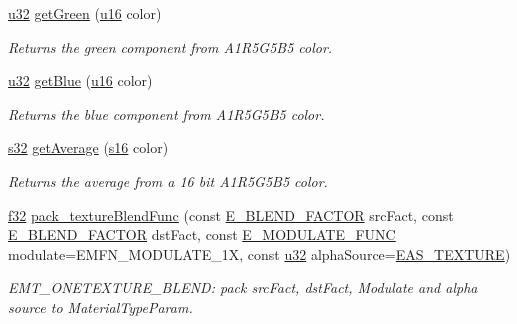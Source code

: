 \begin{DoxyCompactItemize}
\hyperlink{namespaceirr_a0416a53257075833e7002efd0a18e804}{u32} \hyperlink{namespaceirr_1_1video_a3e64185c36326ed33a494ba14cac00a5}{get\+Green} (\hyperlink{namespaceirr_ae9f8ec82692ad3b83c21f555bfa70bcc}{u16} color)
\begin{DoxyCompactList}\small\item\em Returns the green component from A1\+R5\+G5\+B5 color. \end{DoxyCompactList}\item 
\hyperlink{namespaceirr_a0416a53257075833e7002efd0a18e804}{u32} \hyperlink{namespaceirr_1_1video_ae8dc9edd5a3eb01de47933ac2d7f679e}{get\+Blue} (\hyperlink{namespaceirr_ae9f8ec82692ad3b83c21f555bfa70bcc}{u16} color)
\begin{DoxyCompactList}\small\item\em Returns the blue component from A1\+R5\+G5\+B5 color. \end{DoxyCompactList}\item 
\mbox{\label{namespaceirr_1_1video_ab242fde6c6e19ae4100fe39b0dadd9d0}} 
\hyperlink{namespaceirr_ac66849b7a6ed16e30ebede579f9b47c6}{s32} \hyperlink{namespaceirr_1_1video_ab242fde6c6e19ae4100fe39b0dadd9d0}{get\+Average} (\hyperlink{namespaceirr_a43ace0af066371ac0862bac3f7314220}{s16} color)
\begin{DoxyCompactList}\small\item\em Returns the average from a 16 bit A1\+R5\+G5\+B5 color. \end{DoxyCompactList}\item 
\hyperlink{namespaceirr_a0277be98d67dc26ff93b1a6a1d086b07}{f32} \hyperlink{namespaceirr_1_1video_ad4d715752a69b052e582b06283513e49}{pack\+\_\+texture\+Blend\+Func} (const \hyperlink{namespaceirr_1_1video_acae10401850a6cfd5fcf1548c6c884bc}{E\+\_\+\+B\+L\+E\+N\+D\+\_\+\+F\+A\+C\+T\+OR} src\+Fact, const \hyperlink{namespaceirr_1_1video_acae10401850a6cfd5fcf1548c6c884bc}{E\+\_\+\+B\+L\+E\+N\+D\+\_\+\+F\+A\+C\+T\+OR} dst\+Fact, const \hyperlink{namespaceirr_1_1video_a1402e9045137ae232fafbdf385800843}{E\+\_\+\+M\+O\+D\+U\+L\+A\+T\+E\+\_\+\+F\+U\+NC} modulate=E\+M\+F\+N\+\_\+\+M\+O\+D\+U\+L\+A\+T\+E\+\_\+1X, const \hyperlink{namespaceirr_a0416a53257075833e7002efd0a18e804}{u32} alpha\+Source=\hyperlink{namespaceirr_1_1video_a08b237bb445ffc0f32932c8ed87c6e63ad57d5d09230cefbfc77681b6ec2c92fe}{E\+A\+S\+\_\+\+T\+E\+X\+T\+U\+RE})
\begin{DoxyCompactList}\small\item\em E\+M\+T\+\_\+\+O\+N\+E\+T\+E\+X\+T\+U\+R\+E\+\_\+\+B\+L\+E\+ND\+: pack src\+Fact, dst\+Fact, Modulate and alpha source to Material\+Type\+Param. \end{DoxyCompactList}\item 

\end{DoxyCompactItemize}
